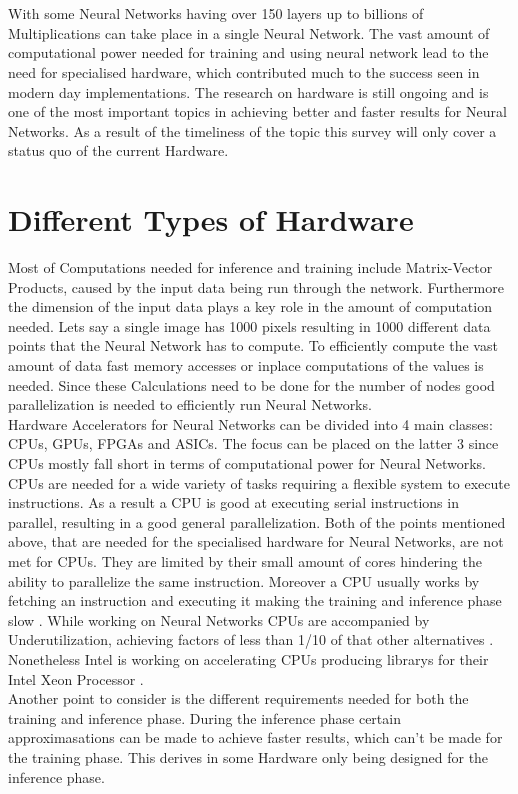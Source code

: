 \documentclass[conference]{IEEEtran}
\begin{document}
\\
\\
With some Neural Networks having over 150 layers \cite{densely_network} up to billions of Multiplications can take place in a single Neural Network. The vast amount of computational power needed for training and using neural network lead to the need for specialised hardware, which contributed much to the success seen in modern day implementations. The research on hardware is still ongoing and is one of the most important topics in achieving better and faster results for Neural Networks. As a result of the timeliness of the topic this survey will only cover a status quo of the current Hardware.
\\

\section{Different Types of Hardware}
Most of Computations needed for inference and training include Matrix-Vector Products, caused by the input data being run through the network.
Furthermore  the dimension of the input data plays a key role in the amount of computation needed. Lets say a single image has 1000 pixels resulting in 1000 different data points that the Neural Network has to compute. To efficiently compute the vast amount of data fast memory accesses or inplace computations of the values is needed. Since these Calculations need to be done for the number of nodes good parallelization is needed to efficiently run Neural Networks.
\\
Hardware Accelerators for Neural Networks can be divided into 4 main classes: CPUs, GPUs, FPGAs and ASICs. The focus can be placed on the latter 3 since CPUs mostly fall short in terms of computational power for Neural Networks. 
CPUs are needed for a wide variety of tasks requiring a flexible system to execute instructions. As a result a CPU is good at executing serial instructions in parallel, resulting in a good general parallelization.
Both of the points mentioned above, that are needed for the specialised hardware for Neural Networks, are not met for CPUs. They are limited by their small amount of cores hindering the ability to parallelize the same instruction. Moreover a CPU usually works by fetching an instruction and executing it making the training and inference phase slow \cite{capra2020updated}. While working on Neural Networks CPUs are accompanied by Underutilization, achieving factors of less than 1/10 of that other alternatives \cite{nurvitadhi2016accelerating}. Nonetheless Intel is working on accelerating CPUs producing librarys for their Intel Xeon Processor \cite{intelnn}.
\\
Another point to consider is the different requirements needed for both the training and inference phase. During the inference phase certain approximasations can be made to achieve faster results, which can't be made for the training phase. This derives in some Hardware only being designed for the inference phase. 
\end{document}
